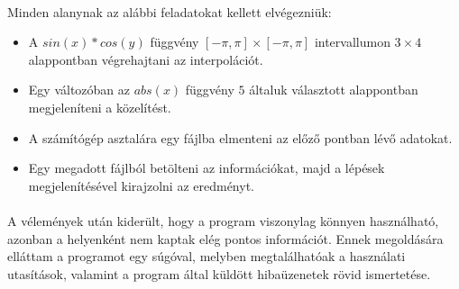 \documentclass[12pt]{report}
\begin{document}
\paragraph{}
Minden alanynak az alábbi feladatokat kellett elvégezniük:
\begin{itemize}
\item A $sin(x)*cos(y)$ függvény $[-\pi, \pi] \times [-\pi, \pi]$ intervallumon $3 \times 4$ alappontban végrehajtani az interpolációt.
\item Egy változóban az $abs(x)$ függvény $5$ általuk választott alappontban megjeleníteni a közelítést.
\item A számítógép asztalára egy fájlba elmenteni az előző pontban lévő adatokat.
\item Egy megadott fájlból betölteni az információkat, majd a lépések megjelenítésével kirajzolni az eredményt.
\end{itemize}
\paragraph{}
A vélemények után kiderült, hogy a program viszonylag könnyen használható, azonban a helyenként nem kaptak elég pontos információt. Ennek megoldására elláttam a programot egy súgóval, melyben megtalálhatóak a használati utasítások, valamint a program által küldött hibaüzenetek rövid ismertetése.
\end{document}

